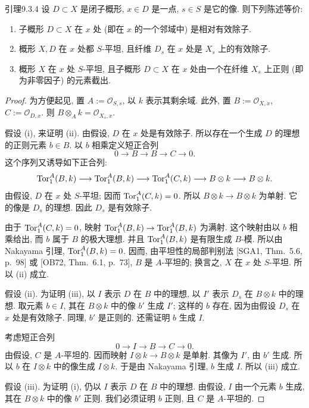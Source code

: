 \begin{origstatement}{引理}{9.3.4}\label{ch09s03:lem934}
设 $D\subset X$ 是闭子概形, $x\in D$ 是一点, $s\in S$ 是它的像. 则下列陈述等价:
\begin{enumerate}
\item[(i)] 子概形 $D\subset X$ 在 $x$ 处 (即在 $x$ 的一个邻域中) 是相对有效除子.
\item[(ii)] 概形 $X,D$ 在 $x$ 处都 $S$-平坦, 且纤维 $D_s$ 在 $x$ 处是 $X_s$ 上的有效除子.
\item[(iii)] 概形 $X$ 在 $x$ 处 $S$-平坦, 且子概形 $D\subset X$ 在 $x$ 处由一个在纤维 $X_s$ 上正则 (即为非零因子) 的元素截出.
\end{enumerate}
\end{origstatement}
\begin{proof}
为方便起见, 置 $A:=\mathcal O_{S,s}$, 以 $k$ 表示其剩余域. 此外, 置 $B:=\mathcal O_{X,x}$, $C:=\mathcal O_{D,x}$. 则 $B\otimes_Ak=\mathcal O_{X_s,x}$.

假设 (i), 来证明 (ii). 由假设, $D$ 在 $x$ 处是有效除子. 所以存在一个生成 $D$ 的理想的正则元素 $b\in B$. 以 $b$ 相乘定义短正合列
\[
0\longrightarrow B\longrightarrow B\longrightarrow C\longrightarrow0.
\]
这个序列又诱导如下正合列:
\[
\operatorname{Tor}_1^A(B,k)\longrightarrow\operatorname{Tor}_1^A(B,k)\longrightarrow\operatorname{Tor}_1^A(C,k)
\longrightarrow B\otimes k\longrightarrow B\otimes k.
\]
由假设, $D$ 在 $x$ 处 $S$-平坦; 因而 $\operatorname{Tor}_1^A(C,k)=0$. 所以 $B\otimes k\to B\otimes k$ 为单射. 它的像是 $D_s$ 的理想. 因此 $D_s$ 是有效除子.

由于 $\operatorname{Tor}_1^A(C,k)=0$, 映射 $\operatorname{Tor}_1^A(B,k)\to\operatorname{Tor}_1^A(B,k)$ 为满射. 这个映射由以 $b$ 相乘给出, 而 $b$ 属于 $B$ 的极大理想. 并且 $\operatorname{Tor}_1^A(B,k)$ 是有限生成 $B$-模. 所以由 Nakayama 引理, $\operatorname{Tor}_1^A(B,k)=0$. 因而, 由平坦性的局部判别法 [SGA1, Thm.~5.6, p.~98] 或 [OB72, Thm.~6.1, p.~73], $B$ 是 $A$-平坦的; 换言之, $X$ 在 $x$ 处 $S$-平坦. 所以 (ii) 成立.

假设 (ii). 为证明 (iii), 以 $I$ 表示 $D$ 在 $B$ 中的理想, 以 $I'$ 表示 $D_s$ 在 $B\otimes k$ 中的理想. 取元素 $b\in I$, 其在 $B\otimes k$ 中的像 $b'$ 生成 $I'$; 这样的 $b$ 存在, 因为由假设 $D_s$ 在 $x$ 处是有效除子. 同理, $b'$ 是正则的. 还需证明 $b$ 生成 $I$.

考虑短正合列
\[
0\longrightarrow I\longrightarrow B\longrightarrow C\longrightarrow0.
\]
由假设, $C$ 是 $A$-平坦的. 因而映射 $I\otimes k\to B\otimes k$ 是单射. 其像为 $I'$, 由 $b'$ 生成. 所以 $b$ 在 $I\otimes k$ 中的像生成 $I\otimes k$. 于是由 Nakayama 引理, $b$ 生成 $I$. 所以 (iii) 成立.

假设 (iii). 为证明 (i), 仍以 $I$ 表示 $D$ 在 $B$ 中的理想. 由假设, $I$ 由一个元素 $b$ 生成, 其在 $B\otimes k$ 中的像 $b'$ 正则. 我们必须证明 $b$ 正则, 且 $C$ 是 $A$-平坦的.


\end{proof}
